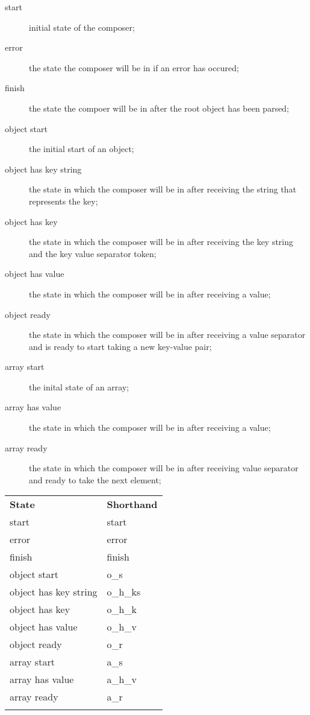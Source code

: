 \documentclass[11pt, letterpaper]{article}
\newcommand{\thickhline}{\specialrule{1pt}{0pt}{0pt}}
\newcommand{\objectstart}{o\_s}
\newcommand{\objectready}{o\_r}
\newcommand{\objecthaskeystring}{o\_h\_ks}
\newcommand{\objecthaskey}{o\_h\_k}
\newcommand{\objecthasvalue}{o\_h\_v}
\newcommand{\arrayhasvalue}{a\_h\_v}
\newcommand{\arraystart}{a\_s}
\begin{document}
    \begin{description}
      \item[start] initial state of the composer;
      \item[error] the state the composer will be in if an error has occured; 
      \item[finish] the state the compoer will be in after the root object has
      been parsed;  
      \item[object start] the initial start of an object;
      \item[object has key string] the state in which the composer will be in 
      after receiving the string that represents the key;
      \item[object has key] the state in which the composer will be in after 
      receiving the key string and the key value separator 
      token;
      \item[object has value] the state in which the composer will be in after
      receiving a value;
      \item[object ready] the state in which the composer will be in after 
      receiving a value separator and is ready to start 
      taking a new key-value pair; 
      \item[array start] the inital state of an array;
      \item[array has value] the state in which the composer will be in after 
      receiving a value;  
      \item[array ready] the state in which the composer will be in after 
      receiving value separator and ready to take the next element; 
    \end{description}
    
    \begin{tabu} to \linewidth{ X[l] | X[l] }
      \thickhline
      \textbf{State} & \textbf{Shorthand} \\ \thickhline
      start & start \\ \hline
      error & error \\ \hline
      finish & finish \\ \hline
      object start & \objectstart \\ \hline
      object has key string & \objecthaskeystring \\ \hline
      object has key & \objecthaskey \\ \hline
      object has value & \objecthasvalue \\ \hline
      object ready & \objectready \\ \hline
      array start & \arraystart \\ \hline
      array has value & \arrayhasvalue \\ \hline
      array ready & a\_r \\ \thickhline
    \end{tabu}
  
\end{document}
